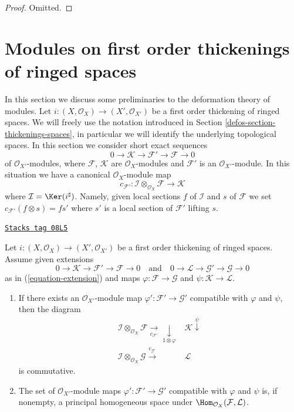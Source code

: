 \begin{proof}
Omitted.
\end{proof}

\section{Modules on first order thickenings of ringed spaces}
\label{defos-section-modules-thickenings}
In this section we discuss some preliminaries to the deformation theory
of modules. Let $i : (X, \mathcal{O}_X) \to (X', \mathcal{O}_{X'})$
be a first order thickening of ringed spaces. We will freely use the notation
introduced in Section \ref{defos-section-thickenings-spaces}, in particular we will
identify the underlying topological spaces.
In this section we consider short exact sequences
\begin{equation}
\label{equation-extension}
0 \to \mathcal{K} \to \mathcal{F}' \to \mathcal{F} \to 0
\end{equation}
of $\mathcal{O}_{X'}$-modules, where $\mathcal{F}$, $\mathcal{K}$ are
$\mathcal{O}_X$-modules and $\mathcal{F}'$ is an $\mathcal{O}_{X'}$-module.
In this situation we have a canonical $\mathcal{O}_X$-module map
$$
c_{\mathcal{F}'} :
\mathcal{I} \otimes_{\mathcal{O}_X} \mathcal{F}
\longrightarrow
\mathcal{K}
$$
where $\mathcal{I} = \Ker(i^\sharp)$.
Namely, given local sections $f$ of $\mathcal{I}$ and $s$
of $\mathcal{F}$ we set $c_{\mathcal{F}'}(f \otimes s) = fs'$
where $s'$ is a local section of $\mathcal{F}'$ lifting $s$.

\begin{lemma}
\label{defos-lemma-inf-map}
\href{https://stacks.math.columbia.edu/tag/08L5}{\texttt{Stacks tag 08L5}}

Let $i : (X, \mathcal{O}_X) \to (X', \mathcal{O}_{X'})$
be a first order thickening of ringed spaces. Assume given
extensions
$$
0 \to \mathcal{K} \to \mathcal{F}' \to \mathcal{F} \to 0
\quad\text{and}\quad
0 \to \mathcal{L} \to \mathcal{G}' \to \mathcal{G} \to 0
$$
as in (\ref{equation-extension})
and maps $\varphi : \mathcal{F} \to \mathcal{G}$ and
$\psi : \mathcal{K} \to \mathcal{L}$.
\begin{enumerate}
\item If there exists an $\mathcal{O}_{X'}$-module
map $\varphi' : \mathcal{F}' \to \mathcal{G}'$ compatible with $\varphi$
and $\psi$, then the diagram
$$
\begin{array}{cc}\mathcal{I} \otimes_{\mathcal{O}_X} \mathcal{F}
\underset{c_{\mathcal{F}'}}{\longrightarrow}\underset{1 \otimes \varphi}{\downarrow} & \mathcal{K} \overset{\psi}{\downarrow} \\ \mathcal{I} \otimes_{\mathcal{O}_X} \mathcal{G}
\overset{c_{\mathcal{G}'}}{\longrightarrow} & \mathcal{L}\end{array}
$$
is commutative.
\item The set of $\mathcal{O}_{X'}$-module
maps $\varphi' : \mathcal{F}' \to \mathcal{G}'$ compatible with $\varphi$
and $\psi$ is, if nonempty, a principal homogeneous space under
$\Hom_{\mathcal{O}_X}(\mathcal{F}, \mathcal{L})$.
\end{enumerate}
\end{lemma}

